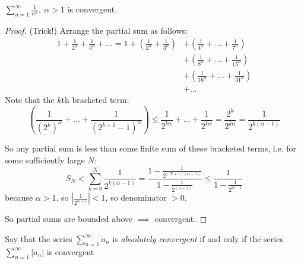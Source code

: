 \documentclass[10pt,twoside]{scrartcl}
\begin{document}
\begin{example}
$\sum_{n=1}^{\infty} \frac{1}{n^{\alpha}},~ \alpha > 1$ is convergent.
\begin{proof}
(Trick!) Arrange the partial sum as follows:
\begin{align*}
1 + \frac{1}{2^\alpha} + \frac{1}{3^\alpha} + \dots  = 1 + \left(\frac{1}{2^\alpha} + \frac{1}{3^\alpha}\right) &+ \left(\frac{1}{4^\alpha} + \dots +\frac{1}{7^\alpha}\right)  \\ 
&+ \left(\frac{1}{8^\alpha} + \dots + \frac{1}{15^\alpha}\right) \\
&+ \left(\frac{1}{16^\alpha} + \dots + \frac{1}{31^\alpha}\right) \\
&+ \dots 
\end{align*}
Note that the $k$th bracketed term:
\[\left(\frac{1}{(2^k)^\alpha} + \dots +\frac{1}{(2^{k+1}-1)^\alpha}\right ) \leq \frac{1}{2^{k\alpha}} + \dots + \frac{1}{2^{k\alpha}} = \frac{2^k}{2^{k\alpha}} = \frac{1}{2^{k(\alpha-1)}}\]

So any partial sum is less than some finite sum of these bracketed terms, i.e. for some sufficiently large $N$: \[ S_N < \sum_{k=0}^{N} \frac{1}{2^{k(\alpha -1)}} = \frac{1-\frac{1}{2^{(N+1)(\alpha -1)}}}{1-\frac{1}{2^{(\alpha-1)}}} \leq \frac{1}{1-\frac{1}{2^{\alpha-1}}}\] because $\alpha >1$, so $\left|\frac{1}{2^{\alpha-1}}\right| < 1$, so denominator $>0$. 

So partial sums are bounded above $\implies$ convergent. 
\end{proof}	
\end{example}\vspace*{5pt}

\begin{definition}
Say that the series $\sum_{n=1}^{\infty}a_n$ is \emph{absolutely convergent} if and only if the series $\sum_{n=1}^{\infty} |a_n|$ is convergent	
\end{definition}\vspace*{5pt}
\end{document}
